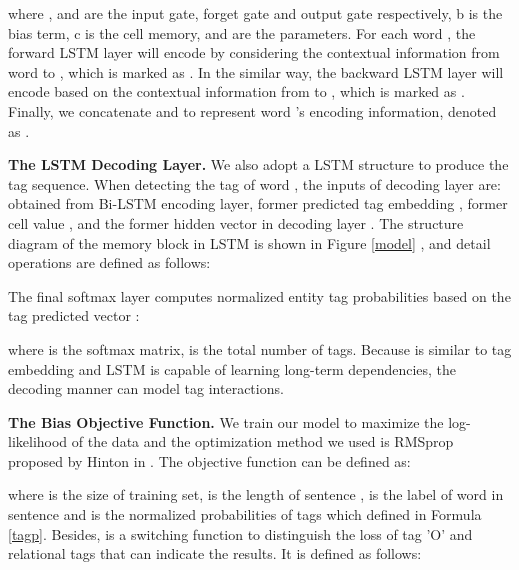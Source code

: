 \documentclass[11pt,a4paper]{article}
\begin{document}
\vspace{-0.5cm}

where ,  and  are the input gate, forget gate and output
gate respectively, b is the bias term, c is the cell memory, and   are the parameters.
For each word , the forward LSTM layer will encode 
by considering the contextual information from word  to , which is marked as .
In the similar way, the backward LSTM layer will encode  based on the contextual information from  to ,
which is marked as .
Finally, we concatenate  and  to represent word 's encoding information, denoted as .

\noindent\textbf{The LSTM Decoding Layer.} We also adopt a LSTM structure to produce the tag sequence.
When detecting the tag of word , the inputs of decoding layer are:
 obtained from Bi-LSTM encoding layer, former predicted tag embedding ,
former cell value ,
and the former hidden vector in decoding layer .
The structure diagram of the memory block in LSTM is shown in Figure \ref{model} ,
and detail operations are defined as follows:

\vspace{-0.8cm}

\vspace{-0.8cm}

\vspace{-0.4cm}

\vspace{-0.8cm}

\vspace{-0.5cm}

\vspace{-0.5cm}

The final softmax layer computes normalized entity tag probabilities based on the tag predicted vector :

\vspace{-0.3cm}

where  is the softmax matrix,  is the total number of tags.
Because  is similar to tag embedding and LSTM is capable of learning long-term dependencies,
the decoding manner can model tag interactions.

\noindent\textbf{The Bias Objective Function.}
We train our model to maximize the log-likelihood of the data and
the optimization method we used is RMSprop proposed by Hinton in \cite{hiton}.
The objective function can be defined as:

where  is the size of training set,
 is the length of sentence ,  is the label of word  in sentence 
and  is the normalized probabilities of tags which defined in Formula \ref{tagp}.
Besides,  is a switching function to distinguish the loss of tag 'O' and relational tags that can indicate the results.
It is defined as follows:
\end{document}
